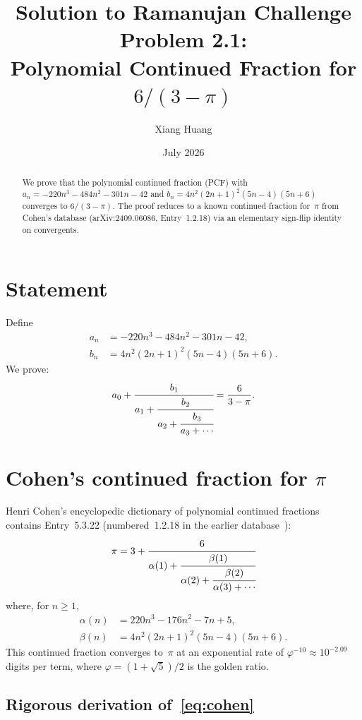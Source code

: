 \documentclass[11pt]{article}
\title{Solution to Ramanujan Challenge Problem 2.1:\\
Polynomial Continued Fraction for $6/(3-\pi)$}
\author{Xiang Huang}
\date{July 2026}
\begin{document}
\maketitle

\begin{abstract}
We prove that the polynomial continued fraction (PCF) with
$a_n = -220n^3 - 484n^2 - 301n - 42$ and
$b_n = 4n^2(2n+1)^2(5n-4)(5n+6)$ converges to $6/(3-\pi)$.
The proof reduces to a known continued fraction for~$\pi$ from
Cohen's database (arXiv:2409.06086, Entry~1.2.18) via an
elementary sign-flip identity on convergents.
\end{abstract}

\section{Statement}

Define
\begin{align}
a_n &= -220n^3 - 484n^2 - 301n - 42, \label{eq:an}\\
b_n &= 4n^2(2n+1)^2(5n-4)(5n+6). \label{eq:bn}
\end{align}
We prove:
\begin{equation}\label{eq:main}
a_0 + \cfrac{b_1}{a_1 + \cfrac{b_2}{a_2 + \cfrac{b_3}{a_3 + \cdots}}}
= \frac{6}{3-\pi}.
\end{equation}

\section{Cohen's continued fraction for $\pi$}

Henri Cohen's encyclopedic dictionary of polynomial continued
fractions~\cite{Cohen2026} contains Entry~5.3.22 (numbered~1.2.18
in the earlier database~\cite{Cohen2024}):
\begin{equation}\label{eq:cohen}
\pi = 3 + \cfrac{6}{\alpha(1) + \cfrac{\beta(1)}{\alpha(2) +
\cfrac{\beta(2)}{\alpha(3) + \cdots}}}
\end{equation}
where, for $n \ge 1$,
\begin{align}
\alpha(n) &= 220n^3 - 176n^2 - 7n + 5, \label{eq:alpha}\\
\beta(n) &= 4n^2(2n+1)^2(5n-4)(5n+6). \label{eq:beta}
\end{align}
This continued fraction converges to~$\pi$ at an exponential
rate of $\varphi^{-10} \approx 10^{-2.09}$ digits per term,
where $\varphi = (1+\sqrt{5})/2$ is the golden ratio.

\subsection{Rigorous derivation of~\eqref{eq:cohen}}
\end{document}
